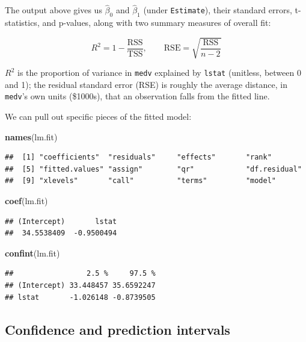 \documentclass[
  11pt,
]{article}
\newenvironment{Shaded}{\begin{snugshade}}{\end{snugshade}}
\newcommand{\FunctionTok}[1]{\textcolor[rgb]{0.13,0.29,0.53}{\textbf{#1}}}
\newcommand{\NormalTok}[1]{#1}
\begin{document}
The output above gives us \(\hat\beta_0\) and \(\hat\beta_1\) (under
\texttt{Estimate}), their standard errors, t-statistics, and p-values,
along with two summary measures of overall fit:

\[
R^2 = 1 - \frac{\text{RSS}}{\text{TSS}}, \qquad
\text{RSE} = \sqrt{\frac{\text{RSS}}{n-2}}
\]

\(R^2\) is the proportion of variance in \texttt{medv} explained by
\texttt{lstat} (unitless, between 0 and 1); the residual standard error
(RSE) is roughly the average distance, in \texttt{medv}'s own units
(\$1000s), that an observation falls from the fitted line.

We can pull out specific pieces of the fitted model:

\begin{Shaded}
\begin{Highlighting}[]
\FunctionTok{names}\NormalTok{(lm.fit)}
\end{Highlighting}
\end{Shaded}

\begin{verbatim}
##  [1] "coefficients"  "residuals"     "effects"       "rank"         
##  [5] "fitted.values" "assign"        "qr"            "df.residual"  
##  [9] "xlevels"       "call"          "terms"         "model"
\end{verbatim}

\begin{Shaded}
\begin{Highlighting}[]
\FunctionTok{coef}\NormalTok{(lm.fit)}
\end{Highlighting}
\end{Shaded}

\begin{verbatim}
## (Intercept)       lstat 
##  34.5538409  -0.9500494
\end{verbatim}

\begin{Shaded}
\begin{Highlighting}[]
\FunctionTok{confint}\NormalTok{(lm.fit)}
\end{Highlighting}
\end{Shaded}

\begin{verbatim}
##                 2.5 %     97.5 %
## (Intercept) 33.448457 35.6592247
## lstat       -1.026148 -0.8739505
\end{verbatim}

\subsection{Confidence and prediction
intervals}\label{confidence-and-prediction-intervals}
\end{document}
